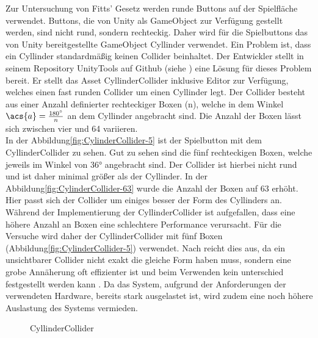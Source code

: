 Zur Untersuchung von Fitts' Gesetz werden runde Buttons auf der Spielfläche verwendet. Buttons, die von Unity als GameObject zur Verfügung gestellt werden, sind nicht rund, sondern rechteckig. Daher wird für die Spielbuttons das von Unity bereitgestellte GameObject {\ttfamily Cyllinder} verwendet. Ein Problem ist, dass ein Cyllinder standardmäßig keinen Collider beinhaltet. Der Entwickler \citeauthor{kode80.2016} stellt in seinem Repository UnityTools auf Github (siehe \cite{kode80.2016}) eine Lösung für dieses Problem bereit. Er stellt das Asset {\ttfamily CyllinderCollider} inklusive Editor zur Verfügung, welches einen fast runden Collider um einen Cyllinder legt. Der Collider besteht aus einer Anzahl definierter rechteckiger Boxen (n), welche in dem Winkel $\acs{a} = \frac{180^\circ}{n}$ an dem Cyllinder angebracht sind. Die Anzahl der Boxen lässt sich zwischen vier und 64 variieren.\\
In der Abbildung\autoref{fig:CylinderCollider-5} ist der Spielbutton mit dem CyllinderCollider zu sehen. Gut zu sehen sind die fünf rechteckigen Boxen, welche jeweils im Winkel von 36° angebracht sind. Der Collider ist hierbei nicht rund und ist daher minimal größer als der Cyllinder. In der Abbildung\autoref{fig:CylinderCollider-63} wurde die Anzahl der Boxen auf 63 erhöht. Hier passt sich der Collider um einiges besser der Form des Cyllinders an. Während der Implementierung der CyllinderCollider ist aufgefallen, dass eine höhere Anzahl an Boxen eine schlechtere Performance verursacht. Für die Versuche wird daher der CyllinderCollider mit fünf Boxen (Abbildung\autoref{fig:CylinderCollider-5}) verwendet. Nach \citeauthor{Colliders.2020} reicht dies aus, da ein unsichtbarer Collider nicht exakt die gleiche Form haben muss, sondern eine grobe Annäherung oft effizienter ist und beim Verwenden kein unterschied festgestellt werden kann \cite{Colliders.2020}. Da das System, aufgrund der Anforderungen der verwendeten Hardware, bereits stark ausgelastet ist, wird zudem eine noch höhere Auslastung des Systems vermieden.

\begin{figure}[!htbp]
	\centering
	\qquad      
	\caption{CyllinderCollider}
	\label{fig:CylinderCollider}
\end{figure}  

